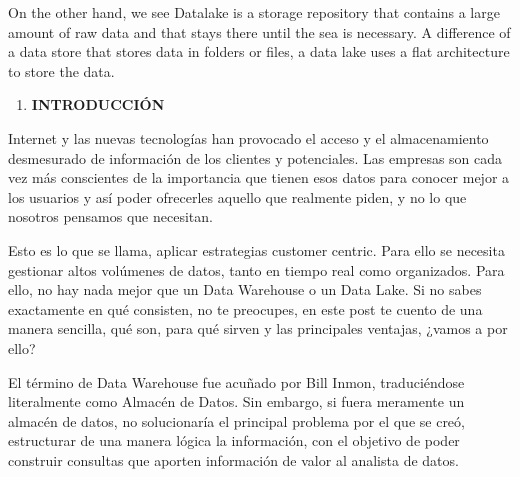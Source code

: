 \documentclass{article} %
\begin{document}
\noindent 

\noindent On the other hand, we see Datalake is a storage repository that contains a large amount of raw data and that stays there until the sea is necessary. A difference of a data store that stores data in folders or files, a data lake uses a flat architecture to store the data.

\noindent \textbf{}

\noindent \textbf{}

\noindent \textbf{}

\noindent \textbf{}

\noindent \textbf{}

\noindent \textbf{}

\noindent \textbf{}

\noindent \textbf{}

\begin{enumerate}
\item \textbf{ INTRODUCCI\'{O}N}
\end{enumerate}

\noindent 

\noindent Internet y las nuevas tecnolog\'{i}as han provocado el acceso y el almacenamiento desmesurado de informaci\'{o}n de los clientes y potenciales. Las empresas son cada vez m\'{a}s conscientes de la importancia que tienen esos datos para conocer mejor a los usuarios y as\'{i} poder ofrecerles aquello que realmente piden, y no lo que nosotros pensamos que necesitan. 

\noindent 

\noindent Esto es lo que se llama, aplicar estrategias customer centric. Para ello se necesita gestionar altos vol\'{u}menes de datos, tanto en tiempo real como organizados. Para ello, no hay nada mejor que un Data Warehouse o un Data Lake. Si no sabes exactamente en qu\'{e} consisten, no te preocupes, en este post te cuento de una manera sencilla, qu\'{e} son, para qu\'{e} sirven y las principales ventajas, ¿vamos a por ello?

\noindent 

\noindent El t\'{e}rmino de Data Warehouse fue acu\~{n}ado por Bill Inmon, traduci\'{e}ndose literalmente como Almac\'{e}n de Datos. Sin embargo, si fuera meramente un almac\'{e}n de datos, no solucionar\'{i}a el principal problema por el que se cre\'{o}, estructurar de una manera l\'{o}gica la informaci\'{o}n, con el objetivo de poder construir consultas que aporten informaci\'{o}n de valor al analista de datos.

\noindent 
\end{document}
